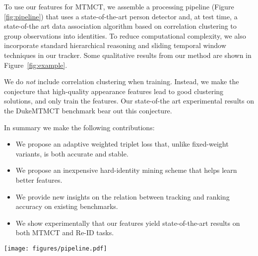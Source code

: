 \documentclass[10pt,twocolumn,letterpaper]{article}
\begin{document}
To use our features for MTMCT, we assemble a processing pipeline (Figure \ref{fig:pipeline}) that uses a state-of-the-art person detector and, at test time, a state-of-the art data association algorithm based on correlation clustering to group observations into identities. To reduce computational complexity, we also incorporate standard hierarchical reasoning and sliding temporal window techniques in our tracker. Some qualitative results from our method are shown in Figure~\ref{fig:example}.

We do \emph{not} include correlation clustering when training. Instead, we make the conjecture that high-quality appearance features lead to good clustering solutions, and only train the features. Our state-of-the art experimental results on the DukeMTMCT benchmark bear out this conjecture. 

In summary we make the following contributions:
\begin{itemize}
    \setlength\itemsep{0em}
    \item We propose an adaptive weighted triplet loss that, unlike fixed-weight variants, is both accurate and stable.
    \item We propose an inexpensive hard-identity mining scheme that helps learn better features.
    \item We provide new insights on the relation between tracking and ranking accuracy on existing benchmarks.
    \item We show experimentally that our features yield state-of-the-art results on both MTMCT and Re-ID tasks.
\end{itemize}






























\begin{figure*}[t]
	\centering
	\texttt{[image: figures/pipeline.pdf]}
	\caption{An illustration of our pipeline for Multi-Target Multi-Camera Tracking. Given video streams, a person detector extracts bounding box observations from video. For trajectory inference, a feature extractor extracts motion and appearance features from observations. These are in turn converted into correlations and labeled using correlation clustering optimization. Finally, post-processing interpolates missing detections and discards low confidence tracks. Multi-stage reasoning repeats trajectory inference for tracklets, single- and multi-camera trajectories. At train time the detector is trained independently, and the feature loss penalizes features that yield wrong correlations.}
	\label{fig:pipeline}
\end{figure*}
\end{document}
